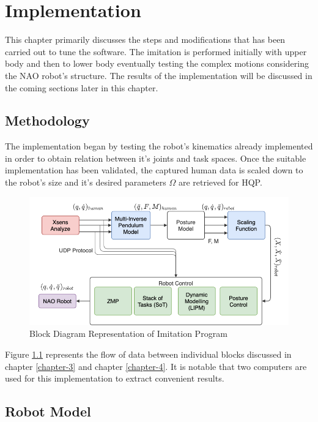 \chapter{Implementation}
\label{chapter-6}

This chapter primarily discusses the steps and modifications that has been carried out to tune the software. The imitation 
is performed initially with upper body and then to lower body eventually testing the complex motions considering the NAO robot's 
structure. The results of the implementation will be discussed in the coming sections later in this chapter.


\section{Methodology}

The implementation began by testing the robot's kinematics already implemented in order to obtain relation between it's joints  and task spaces.
Once the suitable implementation has been validated, the captured human data is scaled down to the robot's size and it's desired parameters $\Omega$
are retrieved for HQP.

\begin{figure}[h!]
    \centering
    \includegraphics[scale=0.5]{images/flowchart-block-diagram.png}\hfill
    \caption{Block Diagram Representation of Imitation Program}\hfill
    \label{fig: block-diagram}
\end{figure}

Figure \ref{fig: block-diagram} represents the flow of data between individual blocks discussed in chapter \ref{chapter-3} and 
chapter \ref{chapter-4}. It is notable that two computers are used for this implementation to extract convenient results.

\section{Robot Model}

